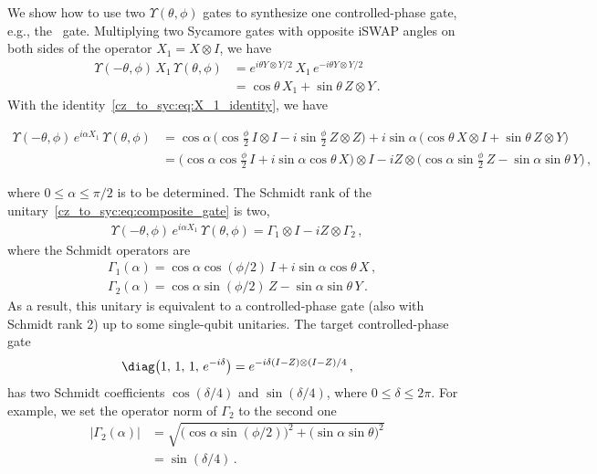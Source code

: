 We show how to use two $\Upsilon(\theta, \phi)$ gates to synthesize one controlled-phase gate, e.g., the \CZ\ gate.  Multiplying two Sycamore gates with opposite iSWAP angles on both sides of the operator $X_1 = X\otimes I$, we have 
\begin{align}
 \Upsilon(-\theta, \phi)\, X_1\, \Upsilon(\theta, \phi)&= e^{i\theta Y\otimes Y /2}\, X_1\,e^{-i\theta Y\otimes Y /2}\nonumber\\
 &= \cos\theta\, X_1 + \sin\theta\, Z\otimes Y\,.\label{cz_to_syc:eq:X_1_identity}
\end{align}
With the identity~\eqref{cz_to_syc:eq:X_1_identity}, we have
\begin{widetext}
\begin{align}
 \Upsilon(-\theta, \phi)\, e^{i\alpha X_1}\, \Upsilon(\theta, \phi)
 &= \cos\alpha\, \Big(\cos\frac{\phi}{2}\,I\otimes I -i\sin\frac{\phi}{2}\, Z\otimes Z\Big) + i\sin\alpha\, \Big(\cos\theta\, X\otimes I + \sin\theta\, Z\otimes Y\Big)\nonumber\\[3pt]
 &= \Big(\cos\alpha\cos\frac{\phi}{2}\, I + i\sin\alpha\cos\theta\, X\Big) \otimes I - i Z\otimes \Big(\cos\alpha\sin\frac{\phi}{2}\, Z - \sin\alpha\sin\theta\, Y\Big)\,,\label{cz_to_syc:eq:composite_gate}
\end{align}
\end{widetext}
where $0 \leq\alpha\leq \pi/2$ is to be determined.  The Schmidt rank of the unitary~\eqref{cz_to_syc:eq:composite_gate} is two, 
\begin{align}
  \Upsilon(-\theta, \phi)\, e^{i\alpha X_1}\, \Upsilon(\theta, \phi) =  \Gamma_1\otimes I -iZ\otimes \Gamma_2\,,
\end{align}
where the Schmidt operators are
\begin{align}
    &\Gamma_1(\alpha) = \cos\alpha\cos(\phi/2)\, I + i\sin\alpha\cos\theta\, X\,,\\[3pt]
    &\Gamma_2(\alpha) = \cos\alpha\sin(\phi/2)\, Z - \sin\alpha\sin\theta\, Y\,.
\end{align}
As a result, this unitary is equivalent to a controlled-phase gate (also with Schmidt rank 2) up to some single-qubit unitaries.  The target controlled-phase gate 
\begin{align}
\diag\big(1,\, 1,\, 1,\, e^{-i\delta}\big) = e^{-i\delta(I-Z)\otimes (I-Z)/4} \,,
\end{align}
has two Schmidt coefficients $\cos(\delta/4)$ and $\sin(\delta/4)$, where $0\leq\delta\leq 2\pi$.  For example, we set the operator norm of $\Gamma_2$ to the second one
\begin{align}
\big\lvert\Gamma_2(\alpha)\big\rvert &= \sqrt{\big(\cos\alpha\sin(\phi/2)\big)^2 + \big(\sin\alpha\sin\theta\big)^2}\nonumber\\[3pt]
&= \sin(\delta/4)\,.\label{cz_to_syc:eq:second_sch_coeff}
\end{align}
